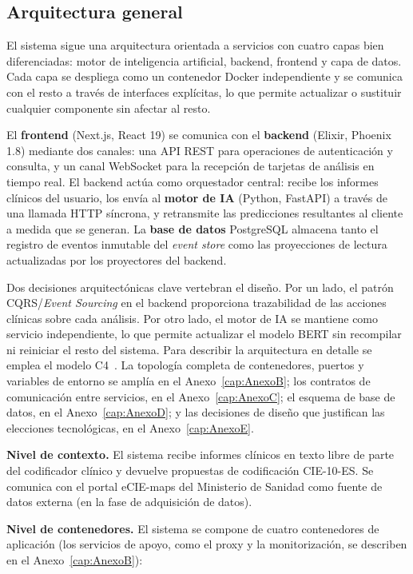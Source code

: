 \subsection{Arquitectura general}

El sistema sigue una arquitectura orientada a servicios con cuatro capas bien diferenciadas: motor de inteligencia artificial, backend, frontend y capa de datos. Cada capa se despliega como un contenedor Docker independiente y se comunica con el resto a través de interfaces explícitas, lo que permite actualizar o sustituir cualquier componente sin afectar al resto.

El \textbf{frontend} (Next.js, React 19) se comunica con el \textbf{backend} (Elixir, Phoenix 1.8) mediante dos canales: una API REST para operaciones de autenticación y consulta, y un canal WebSocket para la recepción de tarjetas de análisis en tiempo real. El backend actúa como orquestador central: recibe los informes clínicos del usuario, los envía al \textbf{motor de IA} (Python, FastAPI) a través de una llamada HTTP síncrona, y retransmite las predicciones resultantes al cliente a medida que se generan. La \textbf{base de datos} PostgreSQL almacena tanto el registro de eventos inmutable del \emph{event store} como las proyecciones de lectura actualizadas por los proyectores del backend.

Dos decisiones arquitectónicas clave vertebran el diseño. Por un lado, el patrón CQRS/\emph{Event Sourcing} en el backend proporciona trazabilidad de las acciones clínicas sobre cada análisis. Por otro lado, el motor de IA se mantiene como servicio independiente, lo que permite actualizar el modelo BERT sin recompilar ni reiniciar el resto del sistema. Para describir la arquitectura en detalle se emplea el modelo C4~\cite{Brown22}. La topología completa de contenedores, puertos y variables de entorno se amplía en el Anexo~\ref{cap:AnexoB}; los contratos de comunicación entre servicios, en el Anexo~\ref{cap:AnexoC}; el esquema de base de datos, en el Anexo~\ref{cap:AnexoD}; y las decisiones de diseño que justifican las elecciones tecnológicas, en el Anexo~\ref{cap:AnexoE}.

\textbf{Nivel de contexto.} El sistema recibe informes clínicos en texto libre de parte del codificador clínico y devuelve propuestas de codificación CIE-10-ES. Se comunica con el portal eCIE-maps del Ministerio de Sanidad como fuente de datos externa (en la fase de adquisición de datos).

\textbf{Nivel de contenedores.} El sistema se compone de cuatro contenedores de aplicación (los servicios de apoyo, como el proxy y la monitorización, se describen en el Anexo~\ref{cap:AnexoB}):


